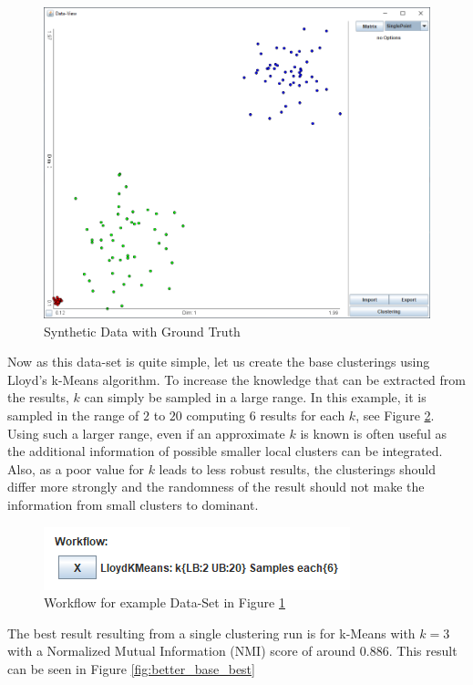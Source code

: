\documentclass[
	a4paper,
	english,
	twoside,
	openright,               
	11pt                            
	]{report}
\begin{document}
\begin{figure}[h]
	\centering
	\includegraphics[scale=.5]{better_base}
	\caption{Synthetic Data with Ground Truth}
	\label{fig:better_base}
\end{figure}

Now as this data-set is quite simple, let us create the base clusterings using Lloyd's k-Means algorithm. To increase the knowledge that can be extracted from the results, $k$ can simply be sampled in a large range. In this example, it is sampled in the range of $2$ to $20$ computing $6$ results for each $k$, see Figure \ref{fig:better_base_wf}. Using such a larger range, even if an approximate $k$ is known is often useful as the additional information of possible smaller local clusters can be integrated. Also, as a poor value for $k$ leads to less robust results, the clusterings should differ more strongly and the randomness of the result should not make the information from small clusters to dominant.

\begin{figure}[h]
	\centering
	\includegraphics[scale=.75]{better_base_wf}
	\caption{Workflow for example Data-Set in Figure \ref{fig:better_base}}
	\label{fig:better_base_wf}
\end{figure}

The best result resulting from a single clustering run is for k-Means with $k=3$ with a Normalized Mutual Information (NMI) score of around $0.886$. This result can be seen in Figure \ref{fig:better_base_best} 
\end{document}
